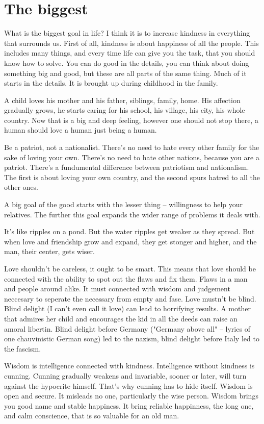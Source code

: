 \chapter{The biggest}

What is the biggest goal in life? I think it is to increase kindness in everything that surrounds us. First of all, kindness is about happiness of all the people. This includes many things, and every time life can give you the task, that you should know how to solve. You can do good in the details, you can think about doing something big and good, but these are all parts of the same thing. Much of it starts in the details. It is brought up during childhood in the family.

A child loves his mother and his father, siblings, family, home. His affection gradually grows, he starts caring for his school, his village, his city, his whole country. Now that is a big and deep feeling, however one should not stop there, a human should love a human just being a human.

Be a patriot, not a nationalist. There's no need to hate every other family for the sake of loving your own. There's no need to hate other nations, because you are a patriot. There's a fundumental difference between patriotism and nationalism. The first is about loving your own country, and the second spurs hatred to all the other ones.

A big goal of the good starts with the lesser thing -- willingness to help your relatives. The further this goal expands the wider range of problems it deals with.

It's like ripples on a pond. But the water ripples get weaker as they spread. But when love and friendship grow and expand, they get stonger and higher, and the man, their center, gets wiser.

Love shouldn't be careless, it ought to be smart. This means that love should be connected with the ability to spot out the flaws and fix them. Flaws in a man and people around alike. It must connected with wisdom and judgement neccesary to seperate the necessary from empty and fase. Love mustn't be blind. Blind delight (I can't even call it love) can lead to horrifying results. A mother that admires her child and encourages the kid in all the deeds can raise an amoral libertin. Blind delight before Germany ("Germany above all" -- lyrics of one chauvinistic German song) led to the nazism, blind delight before Italy led to the fascism.

Wisdom is intelligence connected with kindness. Intelligence without kindness is cunning. Cunning gradually weakens and invariable, sooner or later, will turn against the hypocrite himself. That's why cunning has to hide itself. Wisdom is open and secure. It misleads no one, particularly the wise person. Wisdom brings you good name and stable happiness. It bring reliable happinness, the long one, and calm conscience, that is so valuable for an old man.

